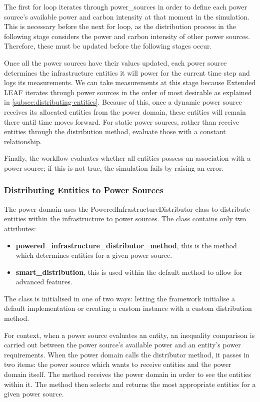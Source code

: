 \documentclass{l4proj}
\begin{document}
The first for loop iterates through power\_sources in order to define each power source's available power and carbon intensity at that moment in the simulation.
This is necessary before the next for loop, as the distribution process in the following stage considers the power and carbon intensity of other power sources. Therefore, these must be updated before the following stages occur.

Once all the power sources have their values updated, each power source determines the infrastructure entities it will power for the current time step and logs its measurements.
We can take measurements at this stage because Extended LEAF iterates through power sources in the order of most desirable as explained in \ref{subsec:distributing-entities}.
Because of this, once a dynamic power source receives its allocated entities from the power domain, these entities will remain there until time moves forward.
For static power sources, rather than receive entities through the distribution method, evaluate those with a constant relationship.

Finally, the workflow evaluates whether all entities possess an association with a power source; if this is not true, the simulation fails by raising an error.
\subsubsection{Distributing Entities to Power Sources}\label{imp:subsec:distributor}
The power domain uses the PoweredInfrastructureDistributor class to distribute entities within the infrastructure to power sources.
The class contains only two attributes:
\begin{itemize}
    \item \textbf{powered\_infrastructure\_distributor\_method}, this is the method which determines entities for a given power source.
    \item \textbf{smart\_distribution}, this is used within the default method to allow for advanced features.
\end{itemize}
The class is initialised in one of two ways: letting the framework initialise a default implementation or creating a custom instance with a custom distribution method.

For context, when a power source evaluates an entity, an inequality comparison is carried out between the power source's available power and an entity's power requirements.
When the power domain calls the distributor method, it passes in two items: the power source which wants to receive entities and the power domain itself.
The method receives the power domain in order to see the entities within it.
The method then selects and returns the most appropriate entities for a given power source.
\end{document}

